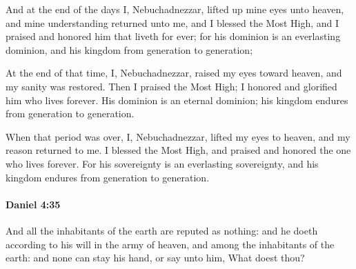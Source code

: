 \begin{versebox}
					\item[ASV] And at the end of the days I, Nebuchadnezzar, lifted up mine eyes unto heaven, and mine understanding returned unto me, and I blessed the Most High, and I praised and honored him that liveth for ever; for his dominion is an everlasting dominion, and his kingdom from generation to generation;
					\item[NIV] At the end of that time, I, Nebuchadnezzar, raised my eyes toward heaven, and my sanity was restored. Then I praised the Most High; I honored and glorified him who lives forever. His dominion is an eternal dominion; his kingdom endures from generation to generation.
					\item[NRSV] When that period was over, I, Nebuchadnezzar, lifted my eyes to heaven, and my reason returned to me. I blessed the Most High, and praised and honored the one who lives forever. For his sovereignty is an everlasting sovereignty, and his kingdom endures from generation to generation.
			\end{versebox}

		\paragraph{Daniel 4:35} %
			\label{DANIEL-4-35}

			And all the inhabitants of the earth are reputed as nothing: and he doeth according to his will in the army of heaven, and among the inhabitants of the earth: and none can stay his hand, or say unto him, What doest thou?

